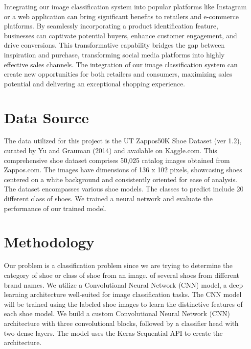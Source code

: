 \documentclass[11pt,a4paper]{article}
\begin{document}
\noindent
Integrating our image classification system into popular platforms like Instagram or a web application can bring significant benefits to retailers and e-commerce platforms. By seamlessly incorporating a product identification feature, businesses can captivate potential buyers, enhance customer engagement, and drive conversions. This transformative capability bridges the gap between inspiration and purchase, transforming social media platforms into highly effective sales channels. The integration of our image classification system can create new opportunities for both retailers and consumers, maximizing sales potential and delivering an exceptional shopping experience. 
	
\section{Data Source} 
The data utilized for this project is the UT Zappos50K Shoe Dataset (ver 1.2), curated by Yu and Grauman (2014) and available on Kaggle.com. This comprehensive shoe dataset comprises 50,025 catalog images obtained from Zappos.com. The images have dimensions of 136 x 102 pixels, showcasing shoes centered on a white background and consistently oriented for ease of analysis. The dataset encompasses various shoe models. The classes to predict include 20 different class of shoes.  We trained a neural network and evaluate the performance of our trained model.  
		
\section{Methodology} 
Our problem is a classification problem since we are trying to determine the category of shoe or class of shoe from an image. of several shoes from different brand names. We utilize a Convolutional Neural Network (CNN) model, a deep learning architecture well-suited for image classification tasks. The CNN model will be trained using the labeled shoe images to learn the distinctive features of each shoe model. We build a custom Convolutional Neural Network (CNN) architecture with three convolutional blocks, followed by a classifier head with two dense layers. The model uses the Keras Sequential API to create the architecture.
\end{document}

